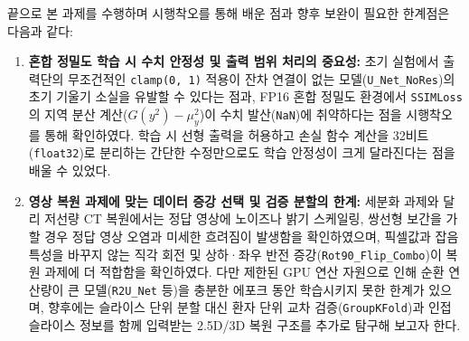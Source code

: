 \documentclass[10pt,a4paper]{article}
\begin{document}
끝으로 본 과제를 수행하며 시행착오를 통해 배운 점과 향후 보완이 필요한 한계점은 다음과 같다:
\begin{enumerate}
  \item \textbf{혼합 정밀도 학습 시 수치 안정성 및 출력 범위 처리의 중요성:} 초기 실험에서 출력단의 무조건적인 \texttt{clamp(0, 1)} 적용이 잔차 연결이 없는 모델(\texttt{U\_Net\_NoRes})의 초기 기울기 소실을 유발할 수 있다는 점과, FP16 혼합 정밀도 환경에서 \texttt{SSIMLoss}의 지역 분산 계산($G(y^2)-\mu_y^2$)이 수치 발산(\texttt{NaN})에 취약하다는 점을 시행착오를 통해 확인하였다. 학습 시 선형 출력을 허용하고 손실 함수 계산을 32비트(\texttt{float32})로 분리하는 간단한 수정만으로도 학습 안정성이 크게 달라진다는 점을 배울 수 있었다.
  \item \textbf{영상 복원 과제에 맞는 데이터 증강 선택 및 검증 분할의 한계:} 세분화 과제와 달리 저선량 CT 복원에서는 정답 영상에 노이즈나 밝기 스케일링, 쌍선형 보간을 가할 경우 정답 영상 오염과 미세한 흐려짐이 발생함을 확인하였으며, 픽셀값과 잡음 특성을 바꾸지 않는 직각 회전 및 상하·좌우 반전 증강(\texttt{Rot90\_Flip\_Combo})이 복원 과제에 더 적합함을 확인하였다. 다만 제한된 GPU 연산 자원으로 인해 순환 연산량이 큰 모델(\texttt{R2U\_Net} 등)을 충분한 에포크 동안 학습시키지 못한 한계가 있으며, 향후에는 슬라이스 단위 분할 대신 환자 단위 교차 검증(\texttt{GroupKFold})과 인접 슬라이스 정보를 함께 입력받는 2.5D/3D 복원 구조를 추가로 탐구해 보고자 한다.
\end{enumerate}
\end{document}
